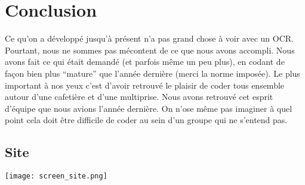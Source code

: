 \documentclass[]{report}
\begin{document}
\chapter{Conclusion}
Ce qu'on a d\'evelopp\'e jusqu'\`a pr\'esent n'a pas grand chose \`a voir avec un OCR. Pourtant, nous ne sommes pas m\'econtent de ce que nous avons accompli. Nous avons fait ce qui \'etait demand\'e (et parfois m\^eme un peu plus), en codant de fa\c con bien plus ``mature'' que l'ann\'ee derni\`ere (merci la norme impos\'ee).
Le plus important \`a nos yeux c'est d'avoir retrouv\'e le plaisir de coder tous ensemble autour d'une cafeti\`ere et d'une multiprise. Nous avons retrouv\'e cet esprit d'\'equipe que nous avions l'ann\'ee derni\`ere. On n'ose m\^eme pas imaginer \`a quel point cela doit \^etre difficile de coder au sein d'un groupe qui ne s'entend pas.



\appendix

\section{Site} %
\label{sec:site}
	\texttt{[image: screen\_site.png]}
  



\end{document}
